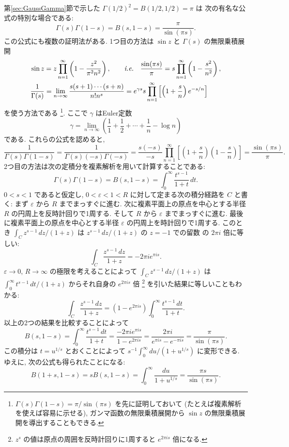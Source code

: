\documentclass[12pt,twoside]{jarticle}
\newcommand\eps{\varepsilon}
\theoremstyle{jplain}
\theoremstyle{jplain}
\theoremstyle{jplain}
\numberwithin{theorem}{section}
\numberwithin{equation}{section}
\numberwithin{figure}{section}
\numberwithin{table}{section}
\newcommand\secref[1]{第\ref{#1}節}
\begin{document}
\secref{sec:GaussGamma}で示した $\Gamma(1/2)^2=B(1/2,1/2)=\pi$ は
次の有名な公式の特別な場合である:
\[
\Gamma(s)\Gamma(1-s)=B(s,1-s)=\frac{\pi}{\sin(\pi s)}.
\]
この公式にも複数の証明法がある. 
1つ目の方法は $\sin z$ と $\Gamma(s)$ の無限乗積展開
\begin{align*}
&
\sin z = z\prod_{n=1}^\infty\left(1-\frac{z^2}{\pi^2 n^2}\right),
\qquad\text{{\it i.e.}}\quad
\frac{\sin(\pi s)}{\pi}=s\prod_{n=1}^\infty\left(1-\frac{s^2}{n^2}\right),
\\ &
\frac{1}{\Gamma(s)}
=\lim_{n\to\infty}\frac{s(s+1)\cdots(s+n)}{n!n^s}
=e^{\gamma s}s\prod_{n=1}^\infty\left[ \left(1+\frac{s}{n}\right)e^{-s/n} \right]
\end{align*}
を使う方法である%
\footnote{$\Gamma(s)\Gamma(1-s)=\pi/\sin(\pi s)$ を先に証明しておいて
(たとえば複素解析を使えば容易に示せる), 
ガンマ函数の無限乗積展開から $\sin z$ の無限乗積展開を導出することもできる.}. 
ここで $\gamma$ はEuler定数
\[
\gamma=\lim_{n\to\infty}\left(\frac11+\frac12+\cdots+\frac1n-\log n\right)
\]
である. これらの公式を認めると,
\[
\frac{1}{\Gamma(s)\Gamma(1-s)}
=\frac{1}{\Gamma(s)(-s)\Gamma(-s)}
=\frac{s(-s)}{-s}\prod_{n=1}^\infty\left[\left(1+\frac{s}{n}\right)\left(1-\frac{s}{n}\right)\right]
=\frac{\sin(\pi s)}{\pi}.
\]
2つ目の方法は次の定積分を複素解析を用いて計算することである:
\[
\Gamma(s)\Gamma(1-s)=B(s,1-s) = \int_0^\infty \frac{t^{s-1}}{1+t}\,dt.
\]
$0<s<1$ であると仮定し, $0<\eps<1<R$ に対して定まる次の積分経路を $C$ と書く:
まず $\eps$ から $R$ までまっすぐに進む. 
次に複素平面上の原点を中心とする半径 $R$ の円周上を反時計回りで1周する.
そして $R$ から $\eps$ までまっすぐに進む.
最後に複素平面上の原点を中心とする半径 $\eps$ の円周上を時計回りで1周する.
このとき $\int_C z^{s-1}\,dz/(1+z)$ は $z^{s-1}\,dz/(1+z)$ の $z=-1$ での留数
の $2\pi i$ 倍に等しい:
\[
\int_C \frac{z^{s-1}\,dz}{1+z} = - 2\pi i e^{\pi i s}.
\]
$\eps\to 0$, $R\to\infty$ の極限を考えることによって $\int_C z^{s-1}\,dz/(1+z)$ は
$\int_0^\infty t^{s-1}\,dt/(1+z)$ からそれ自身の $e^{2\pi i s}$ 倍%
\footnote{$z^s$ の値は原点の周囲を反時計回りに1周すると $e^{2\pi i s}$ 倍になる.}
を引いた結果に等しいこともわかる:
\[
\int_C \frac{z^{s-1}\,dz}{1+z} = (1-e^{2\pi i s})\int_0^\infty\frac{t^{s-1}\,dt}{1+t}.
\]
以上の2つの結果を比較することによって
\[
B(s,1-s)
=\int_0^\infty \frac{t^{s-1}\,dt}{1+t}
=\frac{-2\pi i e^{\pi i s}}{1-e^{2\pi i s}}
=\frac{2\pi i}{e^{\pi i s}-e^{-\pi i s}}
=\frac{\pi}{\sin(\pi s)}.
\]
この積分は $t=u^{1/s}$ とおくことによって
$s^{-1}\int_0^\infty du/(1+u^{1/s})$ に変形できる. 
ゆえに, 次の公式も得られたことになる:
\[
B(1+s,1-s)=sB(s,1-s)
=\int_0^\infty \frac{du}{1+u^{1/s}} = \frac{\pi s}{\sin(\pi s)}.
\]
\end{document}
